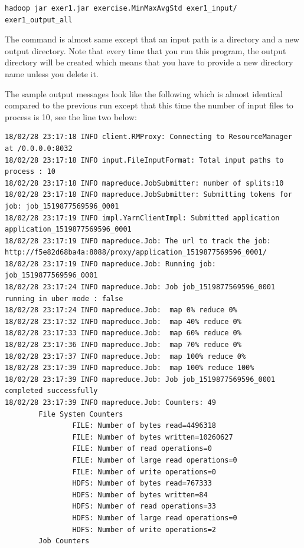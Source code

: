 \begin{lstlisting}
hadoop jar exer1.jar exercise.MinMaxAvgStd exer1_input/ exer1_output_all
\end{lstlisting}

The command is almost same except that an input path is a directory
and a new output directory.  Note that every time that you run this
program, the output directory will be created which means that you
have to provide a new directory name unless you delete it.

The sample output messages look like the following which is almost
identical compared to the previous run except that this time the
number of input files to process is 10, see the line two below:

\begin{lstlisting}
18/02/28 23:17:18 INFO client.RMProxy: Connecting to ResourceManager at /0.0.0.0:8032
18/02/28 23:17:18 INFO input.FileInputFormat: Total input paths to process : 10
18/02/28 23:17:18 INFO mapreduce.JobSubmitter: number of splits:10
18/02/28 23:17:18 INFO mapreduce.JobSubmitter: Submitting tokens for job: job_1519877569596_0001
18/02/28 23:17:19 INFO impl.YarnClientImpl: Submitted application application_1519877569596_0001
18/02/28 23:17:19 INFO mapreduce.Job: The url to track the job: http://f5e82d68ba4a:8088/proxy/application_1519877569596_0001/
18/02/28 23:17:19 INFO mapreduce.Job: Running job: job_1519877569596_0001
18/02/28 23:17:24 INFO mapreduce.Job: Job job_1519877569596_0001 running in uber mode : false
18/02/28 23:17:24 INFO mapreduce.Job:  map 0% reduce 0%
18/02/28 23:17:32 INFO mapreduce.Job:  map 40% reduce 0%
18/02/28 23:17:33 INFO mapreduce.Job:  map 60% reduce 0%
18/02/28 23:17:36 INFO mapreduce.Job:  map 70% reduce 0%
18/02/28 23:17:37 INFO mapreduce.Job:  map 100% reduce 0%
18/02/28 23:17:39 INFO mapreduce.Job:  map 100% reduce 100%
18/02/28 23:17:39 INFO mapreduce.Job: Job job_1519877569596_0001 completed successfully
18/02/28 23:17:39 INFO mapreduce.Job: Counters: 49
        File System Counters
                FILE: Number of bytes read=4496318
                FILE: Number of bytes written=10260627
                FILE: Number of read operations=0
                FILE: Number of large read operations=0
                FILE: Number of write operations=0
                HDFS: Number of bytes read=767333
                HDFS: Number of bytes written=84
                HDFS: Number of read operations=33
                HDFS: Number of large read operations=0
                HDFS: Number of write operations=2
        Job Counters

\end{lstlisting}
